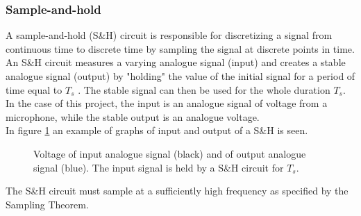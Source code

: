 \subsubsection{Sample-and-hold}
A sample-and-hold (S\&H) circuit is responsible for discretizing a signal from continuous time to discrete time by sampling the signal at discrete points in time. An S\&H circuit measures a varying analogue signal (input) and creates a stable analogue signal (output) by "holding" the value of the initial signal for a period of time equal to $T_s$ \cite{pelgrom}. The stable signal can then be used for the whole duration $T_s$. In the case of this project, the input is an analogue signal of voltage from a microphone, while the stable output is an analogue voltage.\\
In figure \ref{fig:S/H} an example of graphs of input and output of a S\&H is seen.
\begin{figure}[H]
\centering
{}
\caption{Voltage of input analogue signal (black) and of output analogue signal (blue). The input signal is held by a S\&H circuit for $T_s$.}
\label{fig:S/H}
\end{figure}
\noindent The S\&H circuit must sample at a sufficiently high frequency as specified by the Sampling Theorem.
